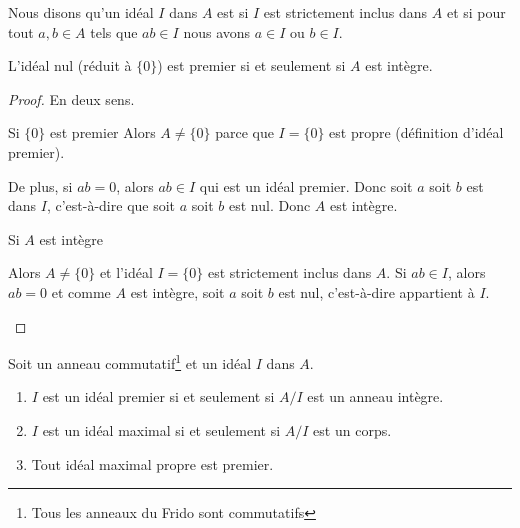 \begin{definition}      \label{DEFooAQSZooVhvQWv}
    Nous disons qu'un idéal \( I\) dans \( A\) est  si \( I\) est strictement inclus dans \( A\) et si pour tout \( a,b\in A\) tels que \( ab\in I\) nous avons \( a\in I\) ou \( b\in I\).
\end{definition}

\begin{lemma}       \label{LEMooYRPBooYxXXsi}
    L'idéal nul (réduit à \( \{ 0 \}\)) est premier si et seulement si \( A\) est intègre.
\end{lemma}

\begin{proof}
    En deux sens.
    \begin{subproof}
    \item[Si \( \{ 0 \}\) est premier]
        Alors \( A\neq \{ 0 \}\) parce que \( I=\{ 0 \}\) est propre (définition d'idéal premier).
        
        De plus, si \( ab=0\), alors \( ab\in I\) qui est un idéal premier. Donc soit \( a\) soit \( b\) est dans \( I\), c'est-à-dire que soit \( a\) soit \( b\) est nul. Donc \( A\) est intègre.

    \item[Si \( A\) est intègre]

        Alors \( A\neq \{ 0 \}\) et l'idéal \( I=\{ 0 \}\) est strictement inclus dans \( A\). Si \( ab\in I\), alors \( ab=0\) et comme \( A\) est intègre, soit \( a\) soit \( b\) est nul, c'est-à-dire appartient à \( I\).
    \end{subproof}
\end{proof}

\begin{proposition}      \label{PROPooRUQKooIfbnQX}
    Soit un anneau commutatif\footnote{Tous les anneaux du Frido sont commutatifs} et un idéal \( I\) dans \( A\).
    \begin{enumerate}
        \item       \label{ITEMooUGBTooOGrnWl}
            \( I\) est un idéal premier si et seulement si \( A/I\) est un anneau intègre.
        \item   \label{ITEMooGLXSooUjINqR}
            \( I\) est un idéal maximal si et seulement si \( A/I\) est un corps.
        \item       \label{ITEMooTFFQooOUajFw}
            Tout idéal maximal propre est premier.
    \end{enumerate}
\end{proposition}



